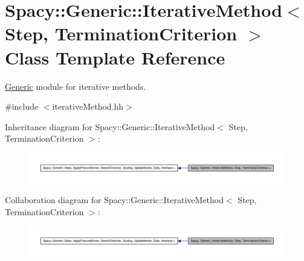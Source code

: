 \hypertarget{classSpacy_1_1Generic_1_1IterativeMethod}{\section{\-Spacy\-:\-:\-Generic\-:\-:\-Iterative\-Method$<$ \-Step, \-Termination\-Criterion $>$ \-Class \-Template \-Reference}
\label{classSpacy_1_1Generic_1_1IterativeMethod}
}


\hyperlink{namespaceSpacy_1_1Generic}{\-Generic} module for iterative methods.  




{\ttfamily \#include $<$iterative\-Method.\-hh$>$}



\-Inheritance diagram for \-Spacy\-:\-:\-Generic\-:\-:\-Iterative\-Method$<$ \-Step, \-Termination\-Criterion $>$\-:
\nopagebreak
\begin{figure}[H]
\begin{center}
\leavevmode
\includegraphics[width=350pt]{classSpacy_1_1Generic_1_1IterativeMethod__inherit__graph}
\end{center}
\end{figure}


\-Collaboration diagram for \-Spacy\-:\-:\-Generic\-:\-:\-Iterative\-Method$<$ \-Step, \-Termination\-Criterion $>$\-:
\nopagebreak
\begin{figure}[H]
\begin{center}
\leavevmode
\includegraphics[width=350pt]{classSpacy_1_1Generic_1_1IterativeMethod__coll__graph}
\end{center}
\end{figure}
